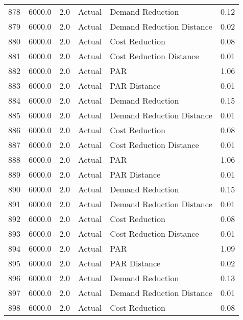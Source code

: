 \begin{longtable}{lrrllr}
878  &       6000.0 &     2.0 &         Actual &           Demand Reduction &   0.12 \\
879  &       6000.0 &     2.0 &         Actual &  Demand Reduction Distance &   0.02 \\
880  &       6000.0 &     2.0 &         Actual &             Cost Reduction &   0.08 \\
881  &       6000.0 &     2.0 &         Actual &    Cost Reduction Distance &   0.01 \\
882  &       6000.0 &     2.0 &         Actual &                        PAR &   1.06 \\
883  &       6000.0 &     2.0 &         Actual &               PAR Distance &   0.01 \\
884  &       6000.0 &     2.0 &         Actual &           Demand Reduction &   0.15 \\
885  &       6000.0 &     2.0 &         Actual &  Demand Reduction Distance &   0.01 \\
886  &       6000.0 &     2.0 &         Actual &             Cost Reduction &   0.08 \\
887  &       6000.0 &     2.0 &         Actual &    Cost Reduction Distance &   0.01 \\
888  &       6000.0 &     2.0 &         Actual &                        PAR &   1.06 \\
889  &       6000.0 &     2.0 &         Actual &               PAR Distance &   0.01 \\
890  &       6000.0 &     2.0 &         Actual &           Demand Reduction &   0.15 \\
891  &       6000.0 &     2.0 &         Actual &  Demand Reduction Distance &   0.01 \\
892  &       6000.0 &     2.0 &         Actual &             Cost Reduction &   0.08 \\
893  &       6000.0 &     2.0 &         Actual &    Cost Reduction Distance &   0.01 \\
894  &       6000.0 &     2.0 &         Actual &                        PAR &   1.09 \\
895  &       6000.0 &     2.0 &         Actual &               PAR Distance &   0.02 \\
896  &       6000.0 &     2.0 &         Actual &           Demand Reduction &   0.13 \\
897  &       6000.0 &     2.0 &         Actual &  Demand Reduction Distance &   0.01 \\
898  &       6000.0 &     2.0 &         Actual &             Cost Reduction &   0.08 \\

\end{longtable}
